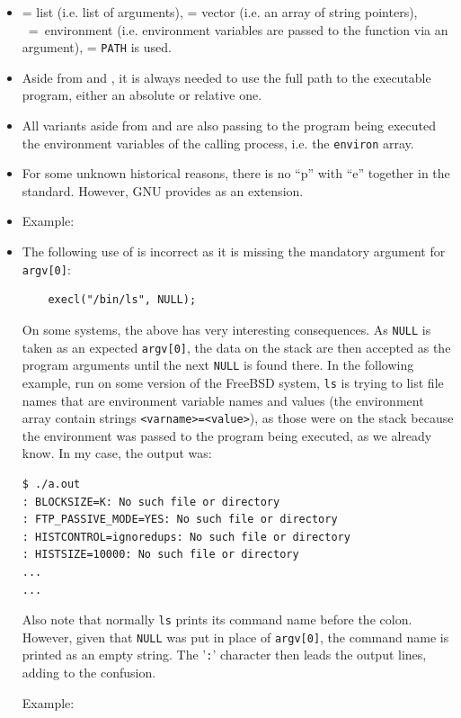 \begin{itemize}
\item {} = list (i.e. list of arguments),  = vector (i.e.  an array
of string pointers), ~=~environment (i.e. environment variables are
passed to the function via an argument),  = \texttt{PATH} is used.
\item Aside from  and , it is always needed to use
the full path to the executable program, either an absolute or relative one.
\item All variants aside from  and 
are also passing to the program being executed the environment variables of the
calling process, i.e. the \texttt{environ} array.
\item For some unknown historical reasons, there is no ``p'' with ``e'' together
in the standard.  However, GNU provides  as an extension.
\item \label{EXEC_DATE} Example: 
\item \label{EXECL} The following use of  is incorrect as it is
missing the mandatory argument for \texttt{argv[0]}:

\begin{verbatim}
	execl("/bin/ls", NULL);
\end{verbatim}

On some systems, the above has very interesting consequences.  As \texttt{NULL}
is taken as an expected \texttt{argv[0]}, the data on the stack are then
accepted as the program arguments until the next \texttt{NULL} is found there.
In the following example, run on some version of the FreeBSD system, \texttt{ls}
is trying to list file names that are environment variable names and values (the
environment array contain strings \texttt{<varname>=<value>}), as those were on
the stack because the environment was passed to the program being executed, as
we already know.  In my case, the output was:

\begin{verbatim}
$ ./a.out 
: BLOCKSIZE=K: No such file or directory
: FTP_PASSIVE_MODE=YES: No such file or directory
: HISTCONTROL=ignoredups: No such file or directory
: HISTSIZE=10000: No such file or directory
...
...
\end{verbatim}

Also note that normally \texttt{ls} prints its command name before the colon.
However, given that \texttt{NULL} was put in place of \texttt{argv[0]}, the
command name is printed as an empty string.  The '\texttt{:}' character then
leads the output lines, adding to the confusion.

Example: 
\end{itemize}

